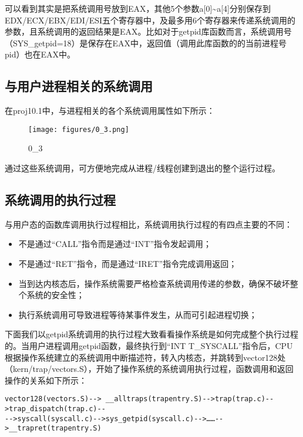 可以看到其实是把系统调用号放到EAX，其他5个参数a{[}0{]}\textasciitilde{}a{[}4{]}分别保存到EDX/ECX/EBX/EDI/ESI五个寄存器中，及最多用6个寄存器来传递系统调用的参数，且系统调用的返回结果是EAX。比如对于getpid库函数而言，系统调用号（SYS\_getpid=18）是保存在EAX中，返回值（调用此库函数的的当前进程号pid）也在EAX中。

\subsection{与用户进程相关的系统调用}\label{ux4e0eux7528ux6237ux8fdbux7a0bux76f8ux5173ux7684ux7cfbux7edfux8c03ux7528}

在proj10.1中，与进程相关的各个系统调用属性如下所示：

\begin{figure}[htbp]
\centering
\texttt{[image: figures/0\_3.png]}
\caption{0\_3}
\end{figure}

通过这些系统调用，可方便地完成从进程/线程创建到退出的整个运行过程。

\subsection{系统调用的执行过程}\label{ux7cfbux7edfux8c03ux7528ux7684ux6267ux884cux8fc7ux7a0b}

与用户态的函数库调用执行过程相比，系统调用执行过程的有四点主要的不同：

\begin{itemize}
\item
  不是通过``CALL''指令而是通过``INT''指令发起调用；
\item
  不是通过``RET''指令，而是通过``IRET''指令完成调用返回；
\item
  当到达内核态后，操作系统需要严格检查系统调用传递的参数，确保不破坏整个系统的安全性；
\item
  执行系统调用可导致进程等待某事件发生，从而可引起进程切换；
\end{itemize}

下面我们以getpid系统调用的执行过程大致看看操作系统是如何完成整个执行过程的。当用户进程调用getpid函数，最终执行到``INT
T\_SYSCALL''指令后，CPU根据操作系统建立的系统调用中断描述符，转入内核态，并跳转到vector128处（kern/trap/vectors.S），开始了操作系统的系统调用执行过程，函数调用和返回操作的关系如下所示：

\begin{lstlisting}
vector128(vectors.S)--> __alltraps(trapentry.S)-->trap(trap.c)-->trap_dispatch(trap.c)--
-->syscall(syscall.c)-->sys_getpid(syscall.c)-->……-->__trapret(trapentry.S)
\end{lstlisting}

